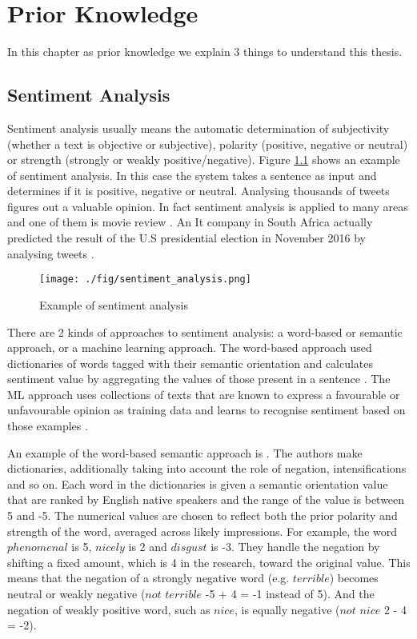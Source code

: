 \chapter{Prior Knowledge}
In this chapter as prior knowledge we explain 3 things to understand this thesis.

\section{Sentiment Analysis} \label{sec:sentimen_analysis}
Sentiment analysis usually means the automatic determination of subjectivity (whether a text is objective or subjective), polarity (positive, negative or neutral) or strength (strongly or weakly positive/negative).
Figure \ref{fig:sentiment_analysis} shows an example of sentiment analysis.
In this case the system takes a sentence as input and determines if it is positive, negative or neutral. 
Analysing thousands of tweets figures out a valuable opinion.
In fact sentiment analysis is applied to many areas and one of them is movie review \cite{movie_review}.
An It company in South Africa actually predicted the result of the U.S presidential election in November 2016 by analysing tweets \cite{us_election}.
\begin{figure}
	\centering
	\texttt{[image: ./fig/sentiment\_analysis.png]}
	\caption{Example of sentiment analysis}
	\label{fig:sentiment_analysis}
\end{figure}


There are 2 kinds of approaches to sentiment analysis: a word-based or semantic approach, or a machine learning approach.
The word-based approach used dictionaries of words tagged with their semantic orientation and calculates sentiment value by aggregating the values of those present in a sentence \cite{Turney}.
The ML approach uses collections of texts that are known to express a favourable or unfavourable opinion as training data and learns to recognise sentiment based on those examples \cite{Pang}.

An example of the word-based semantic approach is \cite{Brooke}.
The authors make dictionaries, additionally taking into account  the role of negation, intensifications and so on.
Each word in the dictionaries is given a semantic orientation value that are ranked by English native speakers and the range of the value is between 5 and -5.
The numerical values are chosen to reflect both the prior polarity and strength of the word, averaged across likely impressions.
For example, the word $phenomenal$ is 5, $nicely$ is 2 and $disgust$ is -3.
They handle the negation by shifting a fixed amount, which is 4 in the research, toward the original value.
This means that the negation of a strongly negative word (e.g. $terrible$) becomes neutral or weakly negative ($not$ $terrible$ -5 + 4 = -1 instead of 5).
And the negation of weakly positive word, such as $nice$, is equally negative ($not$ $nice$ 2 - 4 = -2).

